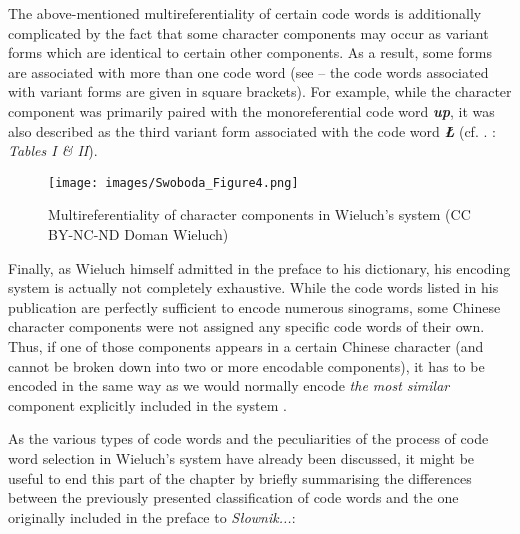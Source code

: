 \documentclass[output=paper,colorlinks,citecolor=brown,arabicfont,chinesefont]{langscibook}
\begin{document}
The above-mentioned multireferentiality of certain code words is additionally complicated by the fact that some character components may occur as variant forms which are identical to certain other components. As a result, some forms are associated with more than one code word (see  – the code words associated with variant forms are given in square brackets). For example, while the character component {} was primarily paired with the monoreferential code word \textbf{\emph{up}}, it was also described as the third variant form associated with the code word \textbf{\emph{Ł}} (cf. . \citealt{Wieluch1936}: \emph{Tables I \& II}).

\begin{figure}
\texttt{[image: images/Swoboda\_Figure4.png]}
\caption{Multireferentiality of character components 
in Wieluch's system (CC BY-NC-ND Doman Wieluch)}
\label{swoboda:fig4}
\end{figure}

Finally, as Wieluch himself admitted in the preface to his dictionary, his encoding system is actually not completely exhaustive. While the code words listed in his publication are perfectly sufficient to encode numerous sinograms, some Chinese character components were not assigned any specific code words of their own. Thus, if one of those components appears in a certain Chinese character (and cannot be broken down into two or more encodable components), it has to be encoded in the same way as we would normally encode \emph{the most similar} component explicitly included in the system \citep[9\textsubscript{p}]{Wieluch1936}.

As the various types of code words and the peculiarities of the process of code word selection in Wieluch's system have already been discussed, it might be useful to end this part of the chapter by briefly summarising the differences between the previously presented classification of code words and the one originally included in the preface to \emph{Słownik...}:
\end{document}
